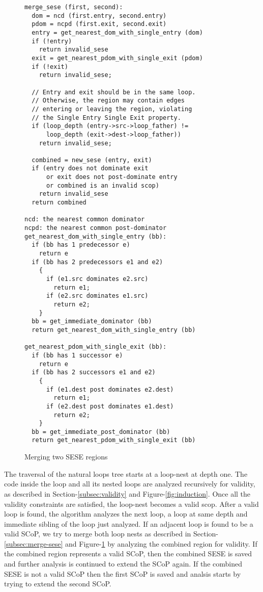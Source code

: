 \documentclass{sigplanconf}
\begin{document}
\begin{figure}
\begin{verbatim}
merge_sese (first, second):
  dom = ncd (first.entry, second.entry)
  pdom = ncpd (first.exit, second.exit)
  entry = get_nearest_dom_with_single_entry (dom)
  if (!entry)
    return invalid_sese
  exit = get_nearest_pdom_with_single_exit (pdom)
  if (!exit)
    return invalid_sese;

  // Entry and exit should be in the same loop.
  // Otherwise, the region may contain edges
  // entering or leaving the region, violating
  // the Single Entry Single Exit property.
  if (loop_depth (entry->src->loop_father) !=
      loop_depth (exit->dest->loop_father))
    return invalid_sese;

  combined = new_sese (entry, exit)
  if (entry does not dominate exit
      or exit does not post-dominate entry
      or combined is an invalid scop)
    return invalid_sese
  return combined

ncd: the nearest common dominator
ncpd: the nearest common post-dominator
get_nearest_dom_with_single_entry (bb):
  if (bb has 1 predecessor e)
    return e
  if (bb has 2 predecessors e1 and e2)
    {
      if (e1.src dominates e2.src)
        return e1;
      if (e2.src dominates e1.src)
        return e2;
    }
  bb = get_immediate_dominator (bb)
  return get_nearest_dom_with_single_entry (bb)

get_nearest_pdom_with_single_exit (bb):
  if (bb has 1 successor e)
    return e
  if (bb has 2 successors e1 and e2)
    {
      if (e1.dest post dominates e2.dest)
        return e1;
      if (e2.dest post dominates e1.dest)
        return e2;
    }
  bb = get_immediate_post_dominator (bb)
  return get_nearest_pdom_with_single_exit (bb)

\end{verbatim}
\caption{Merging two SESE regions}
\label{fig:merge-sese}
\end{figure}


The traversal of the natural loops tree starts at a loop-nest at depth one.  The
code inside the loop and all its nested loops are analyzed recursively for
validity, as described in Section-\ref{subsec:validity} and
Figure-\ref{fig:induction}.  Once all the validity constraints are satisfied,
the loop-nest becomes a valid scop.  After a valid loop is found, the algorithm
analyzes the next loop, a loop at same depth and immediate sibling of the loop
just analyzed.  If an adjacent loop is found to be a valid SCoP, we try to merge
both loop nests as described in Section-\ref{subsec:merge-sese} and
Figure-\ref{fig:merge-sese} by analyzing the combined region for validity.  If
the combined region represents a valid SCoP, then the combined SESE is saved and
further analysis is continued to extend the SCoP again.  If the combined SESE is
not a valid SCoP then the first SCoP is saved and analsis starts by trying to
extend the second SCoP.
\end{document}
